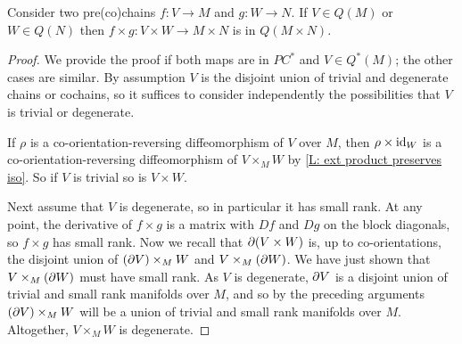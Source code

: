 \begin{lemma}\label{L: exterior Q}
	Consider two pre(co)chains $f \colon V \to M$ and $g \colon W \to N$.
	If $V \in Q(M)$ or $W \in Q(N)$ then $f \times g \colon V \times W \to M \times N$ is in $Q(M \times N)$.
\end{lemma}

\begin{proof}
	We provide the proof if both maps are in $PC^*$ and $V \in Q^*(M)$; the other cases are similar.
	By assumption $V$ is the disjoint union of trivial and degenerate chains or cochains, so it suffices to consider independently the possibilities that $V$ is trivial or degenerate.

	If $\rho$ is a co-orientation-reversing diffeomorphism of $V$ over $M$, then $\rho \times \mathrm{id}_W$ is a co-orientation-reversing diffeomorphism of $V \times_M W$ by \cref{L: ext product preserves iso}.
	So if $V$ is trivial so is $V \times W$.

	Next assume that $V$ is degenerate, so in particular it has small rank.
	At any point, the derivative of $f \times g$ is a matrix with $Df$ and $Dg$ on the block diagonals, so $f \times g$ has small rank.
	Now we recall that $\partial(V \times W)$ is, up to co-orientations, the disjoint union of $(\partial V) \times_M W$ and $V \times_M (\partial W)$.
	We have just shown that $V \times_M (\partial W)$ must have small rank.
	As $V$ is degenerate, $\partial V$ is a disjoint union of trivial and small rank manifolds over $M$, and so by the preceding arguments $(\partial V) \times_M W$ will be a union of trivial and small rank manifolds over $M$.
	Altogether, $V \times_M W$ is degenerate.
\end{proof}

